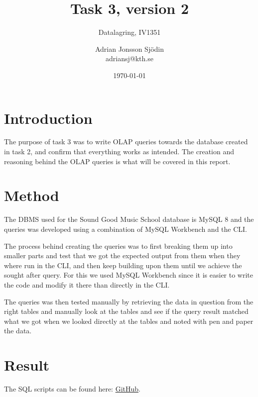 \documentclass[a4paper]{scrreprt}
\title{Task 3, version 2}
\subtitle{Datalagring, IV1351}
\author{Adrian Jonsson Sjödin \\ adriansj@kth.se}
\date{\today}
\begin{document}
\maketitle

\tableofcontents %

\chapter{Introduction}
The purpose of task 3 was to write OLAP queries towards the database created in task 2, and confirm that everything works as intended. The creation and reasoning behind 
the OLAP queries is what will be covered in this report.

\chapter{Method}
The DBMS used for the Sound Good Music School database is MySQL 8 and the queries was developed using a combination of MySQL Workbench and the CLI. 

The process behind creating the queries was to first breaking them up into smaller parts and test that we got the expected output from them when they where run in the CLI, and then 
keep building upon them until we achieve the sought after query. For this we used MySQL Workbench since it is easier to write the code and modify it there than directly in the CLI.

The queries was then tested manually by retrieving the data in question from the right tables and manually look at the tables and see if the query result matched what we got when we looked directly at the tables 
and noted with pen and paper the data. 


\chapter{Result}
\label{sec:result}
The SQL scripts can be found here:
 \href{https://github.com/adrian-jonsson-sjoedin/IV1351-Datalagring/tree/main/project/SQL}{GitHub}.
\end{document}
